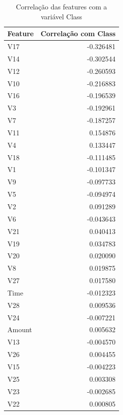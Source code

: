\documentclass[a4paper,12pt]{article}
\begin{document}
\begin{table}[H]
    \centering
    \begin{tabular}{lr}
        \toprule
        \textbf{Feature} & \textbf{Correlação com Class} \\
        \midrule
        V17    & -0.326481 \\
        V14    & -0.302544 \\
        V12    & -0.260593 \\
        V10    & -0.216883 \\
        V16    & -0.196539 \\
        V3     & -0.192961 \\
        V7     & -0.187257 \\
        V11    &  0.154876 \\
        V4     &  0.133447 \\
        V18    & -0.111485 \\
        V1     & -0.101347 \\
        V9     & -0.097733 \\
        V5     & -0.094974 \\
        V2     &  0.091289 \\
        V6     & -0.043643 \\
        V21    &  0.040413 \\
        V19    &  0.034783 \\
        V20    &  0.020090 \\
        V8     &  0.019875 \\
        V27    &  0.017580 \\
        Time   & -0.012323 \\
        V28    &  0.009536 \\
        V24    & -0.007221 \\
        Amount &  0.005632 \\
        V13    & -0.004570 \\
        V26    &  0.004455 \\
        V15    & -0.004223 \\
        V25    &  0.003308 \\
        V23    & -0.002685 \\
        V22    &  0.000805 \\
        \bottomrule
    \end{tabular}
    \caption{Correlação das features com a variável Class}
    \label{tab:correlacao_features_completa}
\end{table}
\end{document}
